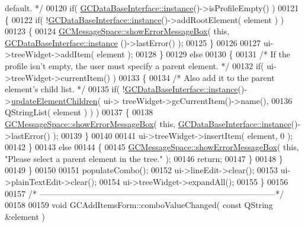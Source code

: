 \begin{DoxyCode}
{       default. */}
00120     \textcolor{keywordflow}{if}( \hyperlink{class_g_c_data_base_interface_a1baea9c0667aa8b610ec30076fcab84c}{GCDataBaseInterface::instance}()->isProfileEmpty() )
00121     \{
00122       \textcolor{keywordflow}{if}( !\hyperlink{class_g_c_data_base_interface_a1baea9c0667aa8b610ec30076fcab84c}{GCDataBaseInterface::instance}()->addRootElement( element ) )
00123       \{
00124         \hyperlink{namespace_g_c_message_space_ab118b3a133686167617eb955029fd44e}{GCMessageSpace::showErrorMessageBox}( \textcolor{keyword}{this}, \hyperlink{class_g_c_data_base_interface_a1baea9c0667aa8b610ec30076fcab84c}{GCDataBaseInterface::instance}
      ()->lastError() );
00125       \}
00126 
00127       ui->treeWidget->addItem( element );
00128     \}
00129     \textcolor{keywordflow}{else}
00130     \{
00131       \textcolor{comment}{/* If the profile isn't empty, the user must specify a parent element. */}
00132       \textcolor{keywordflow}{if}( ui->treeWidget->currentItem() )
00133       \{
00134         \textcolor{comment}{/* Also add it to the parent element's child list. */}
00135         \textcolor{keywordflow}{if}( !\hyperlink{class_g_c_data_base_interface_a1baea9c0667aa8b610ec30076fcab84c}{GCDataBaseInterface::instance}()->\hyperlink{class_g_c_data_base_interface_a91a60134bfb21a3f49d826340bebb852}{updateElementChildren}( ui->
      treeWidget->gcCurrentItem()->name(),
00136                                                                      
      QStringList( element ) ) )
00137         \{
00138           \hyperlink{namespace_g_c_message_space_ab118b3a133686167617eb955029fd44e}{GCMessageSpace::showErrorMessageBox}( \textcolor{keyword}{this}, 
      \hyperlink{class_g_c_data_base_interface_a1baea9c0667aa8b610ec30076fcab84c}{GCDataBaseInterface::instance}()->lastError() );
00139         \}
00140 
00141         ui->treeWidget->insertItem( element, 0 );
00142       \}
00143       \textcolor{keywordflow}{else}
00144       \{
00145         \hyperlink{namespace_g_c_message_space_ab118b3a133686167617eb955029fd44e}{GCMessageSpace::showErrorMessageBox}( \textcolor{keyword}{this}, \textcolor{stringliteral}{"Please select a parent
       element in the tree."} );
00146         \textcolor{keywordflow}{return};
00147       \}
00148     \}
00149   \}
00150 
00151   populateCombo();
00152   ui->lineEdit->clear();
00153   ui->plainTextEdit->clear();
00154   ui->treeWidget->expandAll();
00155 \}
00156 
00157 \textcolor{comment}{/*
      --------------------------------------------------------------------------------------*/}
00158 
00159 \textcolor{keywordtype}{void} GCAddItemsForm::comboValueChanged( \textcolor{keyword}{const} QString &element )

\end{DoxyCode}
